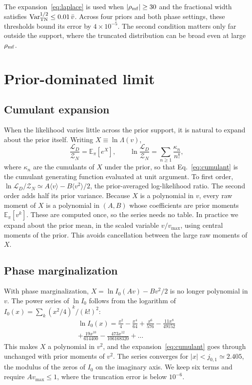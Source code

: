 \documentclass[prd,twocolumn,nofootinbib,superscriptaddress,amsmath,amssymb]{revtex4-2}
\newcommand{\rhomf}{\rho_{\rm mf}}
\newcommand{\vmax}{v_{\max}}
\newcommand{\Lam}{\Lambda}
\newcommand{\E}{\mathbb{E}}
\newcommand{\Var}{\mathrm{Var}}
\begin{document}
The expansion~\eqref{eq:laplace} is used when $|\rhomf|\ge30$ and the fractional width satisfies $\Var_{\rm TN}^{1/2}\le0.01\,\bar v$.
Across four priors and both phase settings,
these thresholds bound its error by $4\times10^{-5}$.
The second condition matters only far outside the support,
where the truncated distribution can be broad even at large $\rhomf$.

\section{Prior-dominated limit}
\label{sec:low}

\subsection{Cumulant expansion}

When the likelihood varies little across the prior support,
it is natural to expand about the prior itself.
Writing $X\equiv\ln\Lam(v)$,
\begin{equation}
\frac{\mathcal{L}_D}{\mathcal{Z}_N} = \E_\pi\!\left[e^{X}\right],
\qquad
\ln\frac{\mathcal{L}_D}{\mathcal{Z}_N} = \sum_{n\ge1}\frac{\kappa_n}{n!},
\label{eq:cumulant}
\end{equation}
where $\kappa_n$ are the cumulants of $X$ under the prior,
so that Eq.~\eqref{eq:cumulant} is the cumulant generating function evaluated at unit argument.
To first order,
$\ln\mathcal{L}_D/\mathcal{Z}_N\simeq A\langle v\rangle - B\langle v^2\rangle/2$,
the prior-averaged log-likelihood ratio.
The second order adds half its prior variance.
Because $X$ is a polynomial in $v$,
every raw moment of $X$ is a polynomial in $(A,B)$ whose coefficients are prior moments $\E_\pi[v^k]$.
These are computed once,
so the series needs no table.
In practice we expand about the prior mean,
in the scaled variable $v/\vmax$,
using central moments of the prior.
This avoids cancellation between the large raw moments of $X$.

\subsection{Phase marginalization}

With phase marginalization,
$X = \ln I_0(Av) - Bv^2/2$ is no longer polynomial in $v$.
The power series of $\ln I_0$ follows from the logarithm of $I_0(x)=\sum_k (x^2/4)^k/(k!)^2$:
\begin{multline}
\ln I_0(x) = \frac{x^2}{4}-\frac{x^4}{64}+\frac{x^6}{576}-\frac{11x^8}{49152}\\
+\frac{19x^{10}}{614400}-\frac{473x^{12}}{106168320}+\dots
\end{multline}
This makes $X$ a polynomial in $v^2$,
and the expansion~\eqref{eq:cumulant} goes through unchanged with prior moments of $v^2$.
The series converges for $|x|<j_{0,1}\simeq2.405$,
the modulus of the zeros of $I_0$ on the imaginary axis.
We keep six terms and require $A\vmax\le1$,
where the truncation error is below $10^{-6}$.
\end{document}
